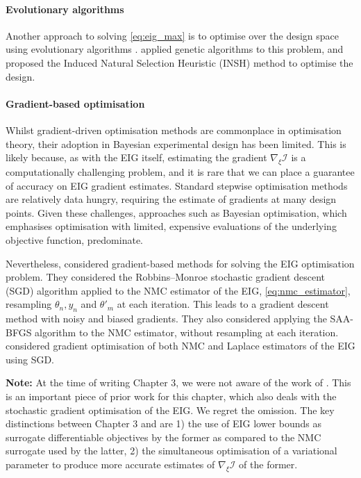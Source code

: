 \documentclass[a4paper, 10pt]{report}
\theoremstyle{plain}
\begin{document}
	
	
	\paragraph{Evolutionary algorithms}
	Another approach to solving \eqref{eq:eig_max} is to optimise over the design space using evolutionary algorithms \citep{eiben2003introduction}.
	\citet{hamada2001finding} applied genetic algorithms to this problem, and \citet{price2018induced} proposed the Induced Natural Selection Heuristic (INSH) method to optimise the design.
	
	\paragraph{Gradient-based optimisation}
	Whilst gradient-driven optimisation methods are commonplace in optimisation theory, their adoption in Bayesian experimental design has been limited.
	This is likely because, as with the EIG itself, estimating the gradient $\nabla_\xi \mathcal{I}$ is a computationally challenging problem, and it is rare that we can place a guarantee of accuracy on EIG gradient estimates.
	Standard stepwise optimisation methods are relatively data hungry, requiring the estimate of gradients at many design points.
	Given these challenges, approaches such as Bayesian optimisation, which emphasises optimisation with limited, expensive evaluations of the underlying objective function, predominate.
	
	Nevertheless, \citet{huan2014gradient} considered gradient-based methods for solving the EIG optimisation problem.
	They considered the Robbins--Monroe stochastic gradient descent (SGD) \citep{robbins1951stochastic} algorithm applied to the NMC estimator of the EIG, \eqref{eq:nmc_estimator}, resampling $\theta_n,y_n$ and $\theta'_m$ at each iteration.
	This leads to a gradient descent method with noisy and biased gradients.
	They also considered applying the SAA-BFGS algorithm \citep{fletcher2013practical} to the NMC estimator, without resampling at each iteration.
	\citet{carlon2020nesterov} considered gradient optimisation of both NMC and Laplace estimators of the EIG using SGD.
	
	\textbf{Note:} At the time of writing Chapter 3, we were not aware of the work of \citet{huan2014gradient}. This is an important piece of prior work for this chapter, which also deals with the stochastic gradient optimisation of the EIG.
	We regret the omission.
	The key distinctions between Chapter 3 and \citet{huan2014gradient} are 1) the use of EIG lower bounds as surrogate differentiable objectives by the former as compared to the NMC surrogate used by the latter, 2) the simultaneous optimisation of a variational parameter to produce more accurate estimates of $\nabla_\xi \mathcal{I}$ of the former.
	
\end{document}
